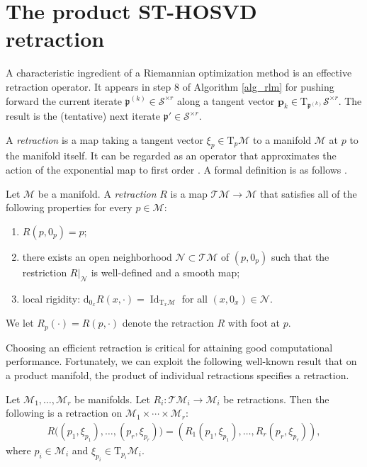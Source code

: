 \documentclass[a4paper,10pt,final]{siamart1116}
\newcommand{\tuple}[1]{\mathfrak{#1}}
\newcommand{\Var}[1]{\mathcal{#1}}
\newcommand{\vect}[1]{\mathbf{#1}}
\newcommand{\Tang}[2]{\mathrm{T}_{#1} {#2}}
\newcommand{\deriv}[2]{\mathrm{d}_{#1}#2}
\newcommand{\refalg}[1]{Algorithm \ref{#1}}
\numberwithin{equation}{section}
\numberwithin{figure}{section}
\numberwithin{table}{section}
\numberwithin{theorem}{section}
\begin{document}
\section{The product ST-HOSVD retraction} \label{sec_retraction}
A characteristic ingredient of a Riemannian optimization method is an effective retraction operator. It appears in step {8} of \refalg{alg_rlm} for pushing forward the current iterate $\tuple{p}^{(k)} \in \Var{S}^{\times r}$ along a tangent vector $\vect{p}_k \in \Tang{\tuple{p}^{(k)}}{\Var{S}^{\times r}}$. The result is the (tentative) next iterate $\tuple{p}' \in \Var{S}^{\times r}$.

A \emph{retraction} is a map taking a tangent vector $\xi_p \in \Tang{p}{\Var{M}}$ to a manifold $\Var{M}$ at $p$ to the manifold itself. It can be regarded as an operator that approximates the action of the exponential map to first order \cite{AMS2008}. A formal definition is as follows \cite{ADMMS2002,AMS2008}.
\begin{definition}\label{def_retraction}
Let $\Var{M}$ be a manifold. A \emph{retraction} $R$ is a map $\Var{T}\Var{M} \to \Var{M}$ that satisfies all of the following properties for every $p \in \Var{M}$:
\begin{enumerate}
\item $R(p,0_p) = p$;
\item there exists {an open} neighborhood $\Var{N} \subset \Var{T}{\Var{M}}$ of $(p,0_p)$ such that the restriction $R|_\Var{N}$ is well-defined and a smooth map;
\item local rigidity: $\deriv{0_x}{R(x,\cdot)} = \operatorname{Id}_{\Tang{x}{\Var{M}}}$ for all $(x, 0_x) \in \Var{N}$.
\end{enumerate}
We let $R_p(\cdot) = R(p,\cdot)$ denote the retraction $R$ with foot at $p$.
\end{definition}

Choosing an efficient retraction is critical for attaining good computational performance.
Fortunately, we can exploit the following well-known result that on a product manifold, the product of individual retractions specifies a retraction.
\begin{lemma} \label{lem_product_retraction}
 Let $\Var{M}_1,\ldots,\Var{M}_r$ be manifolds. Let $R_i : \Var{T}\Var{M}_i \to \Var{M}_i$ be retractions. Then the following is a retraction on $\Var{M}_1 \times \cdots \times \Var{M}_r$:
 \begin{align*}
  R\bigl( (p_1, \xi_{p_1}), \ldots, (p_r, \xi_{p_r}) \bigr) = (R_1(p_1, \xi_{p_1}), \ldots, R_r(p_r, \xi_{p_r})),
 \end{align*}
 where $p_i \in \Var{M}_i$ and $\xi_{p_i} \in \Tang{p_i}{\Var{M}_i}.$
\end{lemma}
\end{document}
